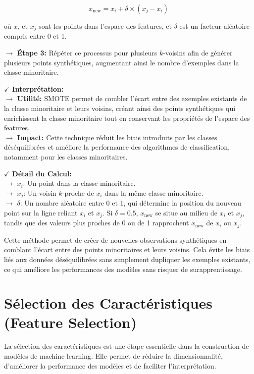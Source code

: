     \[
    x_{\text{new}} = x_i + \delta \times (x_j - x_i)
    \]
    
    où \(x_i\) et \(x_j\) sont les points dans l'espace des features, et \(\delta\) est un facteur aléatoire compris entre 0 et 1.
    
\textbf{\(\rightarrow\)} \textbf{Étape 3:} Répéter ce processus pour plusieurs \(k\)-voisins afin de générer plusieurs points synthétiques, augmentant ainsi le nombre d'exemples dans la classe minoritaire.

\textbf{\(\checkmark\)} \textbf{Interprétation:}\\
\textbf{\(\rightarrow\)} \textbf{Utilité:} SMOTE permet de combler l'écart entre des exemples existants de la classe minoritaire et leurs voisins, créant ainsi des points synthétiques qui enrichissent la classe minoritaire tout en conservant les propriétés de l'espace des features.\\
\textbf{\(\rightarrow\)} \textbf{Impact:} Cette technique réduit les biais introduits par les classes déséquilibrées et améliore la performance des algorithmes de classification, notamment pour les classes minoritaires.

\textbf{\(\checkmark\)} \textbf{Détail du Calcul:}\\
\textbf{\(\rightarrow\)} \(x_i\): Un point dans la classe minoritaire.\\
\textbf{\(\rightarrow\)} \(x_j\): Un voisin \(k\)-proche de \(x_i\) dans la même classe minoritaire.\\
\textbf{\(\rightarrow\)} \(\delta\): Un nombre aléatoire entre 0 et 1, qui détermine la position du nouveau point sur la ligne reliant \(x_i\) et \(x_j\). Si \(\delta = 0.5\), \(x_{\text{new}}\) se situe au milieu de \(x_i\) et \(x_j\), tandis que des valeurs plus proches de 0 ou de 1 rapprochent \(x_{\text{new}}\) de \(x_i\) ou \(x_j\).

Cette méthode permet de créer de nouvelles observations synthétiques en comblant l'écart entre des points minoritaires et leurs voisins. Cela évite les biais liés aux données déséquilibrées sans simplement dupliquer les exemples existants, ce qui améliore les performances des modèles sans risquer de surapprentissage.

\section{Sélection des Caractéristiques (Feature Selection)}

La sélection des caractéristiques est une étape essentielle dans la construction de modèles de machine learning. Elle permet de réduire la dimensionnalité, d'améliorer la performance des modèles et de faciliter l'interprétation. 

